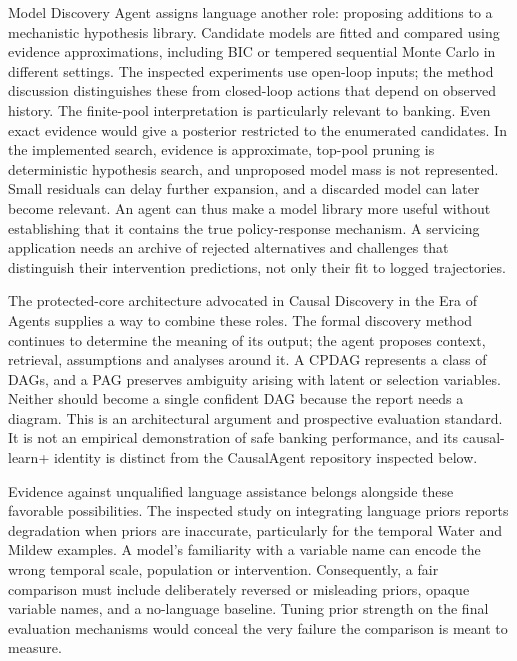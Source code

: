 Model Discovery Agent assigns language another role: proposing additions to
a mechanistic hypothesis library. Candidate models are fitted and compared
using evidence approximations, including BIC or tempered sequential Monte
Carlo in different settings. The inspected experiments use open-loop inputs;
the method discussion distinguishes these from closed-loop actions that
depend on observed history. The finite-pool interpretation is particularly
relevant to banking. Even exact evidence would give a posterior restricted
to the enumerated candidates. In the implemented search, evidence is
approximate, top-pool pruning is deterministic hypothesis search, and
unproposed model mass is not represented. Small residuals can delay further
expansion, and a discarded model can later become relevant. An agent can
thus make a model library more useful without establishing that it contains
the true policy-response mechanism. A servicing application needs an archive
of rejected alternatives and challenges that distinguish their intervention
predictions, not only their fit to logged trajectories.
\citep{v12_la_2608_09696}

The protected-core architecture advocated in Causal Discovery in the Era of
Agents supplies a way to combine these roles. The formal discovery method
continues to determine the meaning of its output; the agent proposes context,
retrieval, assumptions and analyses around it. A CPDAG represents a class of
DAGs, and a PAG preserves ambiguity arising with latent or selection
variables. Neither should become a single confident DAG because the report
needs a diagram. This is an architectural argument and prospective
evaluation standard. It is not an empirical demonstration of safe banking
performance, and its causal-learn+ identity is distinct from the CausalAgent
repository inspected below.
\citep{v12_la_2606_23608}

Evidence against unqualified language assistance belongs alongside these
favorable possibilities. The inspected study on integrating language priors
reports degradation when priors are inaccurate, particularly for the
temporal Water and Mildew examples. A model's familiarity with a variable
name can encode the wrong temporal scale, population or intervention.
Consequently, a fair comparison must include deliberately reversed or
misleading priors, opaque variable names, and a no-language baseline. Tuning
prior strength on the final evaluation mechanisms would conceal the very
failure the comparison is meant to measure.
\citep{v12_la_2306_16902,exec15_latent_design}

